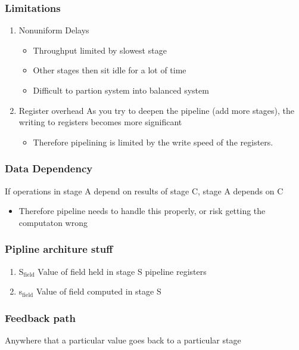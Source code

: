 \documentclass[11pt]{article}
\begin{document}
\subsubsection{Limitations}
\label{sec:orgheadline32}
\begin{enumerate}
\item Nonuniform Delays
\label{sec:orgheadline30}
\begin{itemize}
\item Throughput limited by slowest stage
\item Other stages then sit idle for a lot of time
\item Difficult to partion system into balanced system
\end{itemize}
\item Register overhead
\label{sec:orgheadline31}
As you try to deepen the pipeline (add more stages), the writing to registers becomes more significant
\begin{itemize}
\item Therefore pipelining is limited by the write speed of the registers.
\end{itemize}
\end{enumerate}
\subsubsection{Data Dependency}
\label{sec:orgheadline33}
If operations in stage A depend on results of stage C, stage A depends on C
\begin{itemize}
\item Therefore pipeline needs to handle this properly, or risk getting the computaton wrong
\end{itemize}
\subsubsection{Pipline architure stuff}
\label{sec:orgheadline36}
\begin{enumerate}
\item S\(_{\text{field}}\)
\label{sec:orgheadline34}
Value of field held in stage S pipeline registers
\item s\(_{\text{field}}\)
\label{sec:orgheadline35}
Value of field computed in stage S
\end{enumerate}
\subsubsection{Feedback path}
\label{sec:orgheadline37}
Anywhere that a particular value goes back to a particular stage
\end{document}
